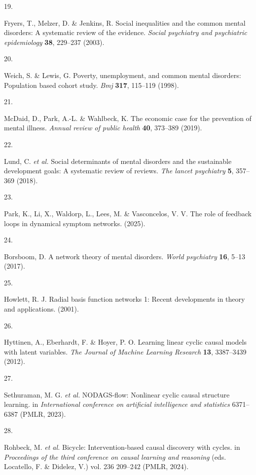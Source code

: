 \documentclass[
]{article}
\newlength{\cslhangindent}
\newlength{\csllabelwidth}
\newenvironment{CSLReferences}[2] %
 {\begin{list}{}{%
  \setlength{\itemindent}{0pt}
  \setlength{\leftmargin}{0pt}
  \setlength{\parsep}{0pt}
  \ifodd #1
   \setlength{\leftmargin}{\cslhangindent}
   \setlength{\itemindent}{-1\cslhangindent}
  \fi
  \setlength{\itemsep}{#2\baselineskip}}}
 {\end{list}}
\newcommand{\CSLLeftMargin}[1]{\parbox[t]{\csllabelwidth}{\strut#1\strut}}
\newcommand{\CSLRightInline}[1]{\parbox[t]{\linewidth - \csllabelwidth}{\strut#1\strut}}
\begin{document}
\begin{CSLReferences}{0}{0}
\CSLLeftMargin{19. }%
\CSLRightInline{Fryers, T., Melzer, D. \& Jenkins, R. Social
inequalities and the common mental disorders: A systematic review of the
evidence. \emph{Social psychiatry and psychiatric epidemiology}
\textbf{38}, 229--237 (2003).}

\CSLLeftMargin{20. }%
\CSLRightInline{Weich, S. \& Lewis, G. Poverty, unemployment, and common
mental disorders: Population based cohort study. \emph{Bmj}
\textbf{317}, 115--119 (1998).}

\CSLLeftMargin{21. }%
\CSLRightInline{McDaid, D., Park, A.-L. \& Wahlbeck, K. The economic
case for the prevention of mental illness. \emph{Annual review of public
health} \textbf{40}, 373--389 (2019).}

\CSLLeftMargin{22. }%
\CSLRightInline{Lund, C. \emph{et al.} Social determinants of mental
disorders and the sustainable development goals: A systematic review of
reviews. \emph{The lancet psychiatry} \textbf{5}, 357--369 (2018).}

\CSLLeftMargin{23. }%
\CSLRightInline{Park, K., Li, X., Waldorp, L., Lees, M. \& Vasconcelos,
V. V. The role of feedback loops in dynamical symptom networks. (2025).}

\CSLLeftMargin{24. }%
\CSLRightInline{Borsboom, D. A network theory of mental disorders.
\emph{World psychiatry} \textbf{16}, 5--13 (2017).}

\CSLLeftMargin{25. }%
\CSLRightInline{Howlett, R. J. Radial basis function networks 1: Recent
developments in theory and applications. (2001).}

\CSLLeftMargin{26. }%
\CSLRightInline{Hyttinen, A., Eberhardt, F. \& Hoyer, P. O. Learning
linear cyclic causal models with latent variables. \emph{The Journal of
Machine Learning Research} \textbf{13}, 3387--3439 (2012).}

\CSLLeftMargin{27. }%
\CSLRightInline{Sethuraman, M. G. \emph{et al.} NODAGS-flow: Nonlinear
cyclic causal structure learning. in \emph{International conference on
artificial intelligence and statistics} 6371--6387 (PMLR, 2023).}

\CSLLeftMargin{28. }%
\CSLRightInline{Rohbeck, M. \emph{et al.} Bicycle: Intervention-based
causal discovery with cycles. in \emph{Proceedings of the third
conference on causal learning and reasoning} (eds. Locatello, F. \&
Didelez, V.) vol. 236 209--242 (PMLR, 2024).}


\end{CSLReferences}
\end{document}
